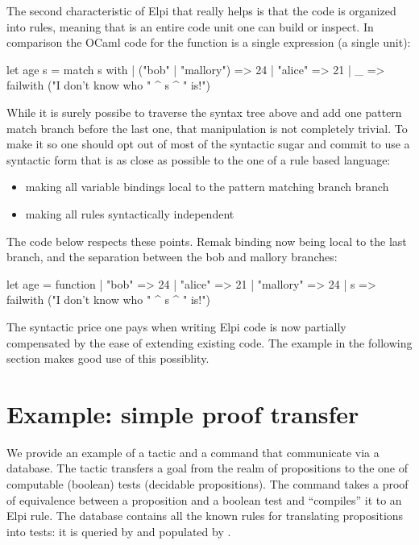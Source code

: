 \documentclass[a4paper, 11pt]{book}
\begin{document}
The second characteristic of Elpi that really helps is that the code is
organized into rules, meaning that  is an entire code
unit one can build or inspect. In comparison the OCaml code for the
 function is a single expression (a single unit):

\begin{ocamlcode}
let age s =
  match s with
  | ("bob" | "mallory") => 24
  | "alice" => 21
  | _ => failwith ("I don't know who " ^ s ^ " is!")
\end{ocamlcode}

While it is surely possibe to traverse the syntax tree above and add one
pattern match branch before the last one, that manipulation is not completely
trivial. To make it so one should opt out of most of the syntactic sugar and
commit to use a syntactic form that is as close as possible to the one
of a rule based language:
\begin{itemize}
  \item making all variable bindings local to the pattern matching branch branch
  \item making all rules syntactically independent
\end{itemize}

The code below respects these points. Remak  binding now
being local to the last branch, and the separation between the bob and
mallory branches:

\begin{ocamlcode}
let age = function
  | "bob" => 24
  | "alice" => 21
  | "mallory" => 24
  | s => failwith ("I don't know who " ^ s ^ " is!")
\end{ocamlcode}
  
The syntactic price one pays when writing Elpi code is now partially
compensated by the ease of extending existing code.
The example in the following section makes good use of this possiblity.

\section{Example: simple proof transfer}\label{sec:tb}

We provide an example of a tactic and a command that communicate via
a database. The tactic  transfers a goal from the realm
of propositions to the one of computable (boolean) tests (decidable propositions).
The command  takes a proof of equivalence
between a proposition and a boolean test and ``compiles'' it to an Elpi rule.
The database contains all the known rules for translating propositions into
tests: it is queried by  and populated by .
\end{document}
